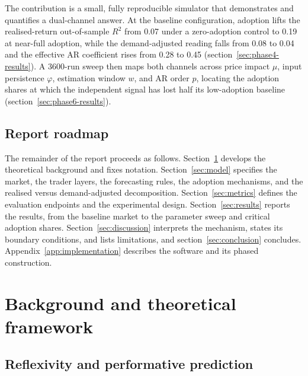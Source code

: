 \documentclass[12pt]{article}
\begin{document}
The contribution is a small, fully reproducible simulator that demonstrates and quantifies a dual-channel answer. At the baseline configuration, adoption lifts the realised-return out-of-sample $R^{2}$ from 0.07 under a zero-adoption control to 0.19 at near-full adoption, while the demand-adjusted reading falls from 0.08 to 0.04 and the effective AR coefficient rises from 0.28 to 0.45 (section~\ref{sec:phase4-results}). %
A 3600-run sweep then maps both channels across price impact $\mu$, input persistence $\varphi$, estimation window $w$, and AR order $p$, locating the adoption shares at which the independent signal has lost half its low-adoption baseline (section~\ref{sec:phase6-results}). %

\subsection{Report roadmap}

The remainder of the report proceeds as follows. Section~\ref{sec:background} develops the theoretical background and fixes notation. Section~\ref{sec:model} specifies the market, the trader layers, the forecasting rules, the adoption mechanisms, and the realised versus demand-adjusted decomposition. Section~\ref{sec:metrics} defines the evaluation endpoints and the experimental design. Section~\ref{sec:results} reports the results, from the baseline market to the parameter sweep and critical adoption shares. Section~\ref{sec:discussion} interprets the mechanism, states its boundary conditions, and lists limitations, and section~\ref{sec:conclusion} concludes. Appendix~\ref{app:implementation} describes the software and its phased construction. %


\section{Background and theoretical framework}\label{sec:background}

\subsection{Reflexivity and performative prediction}
\end{document}
